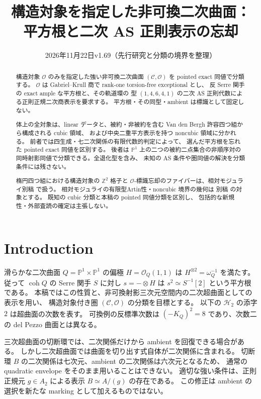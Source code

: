 \documentclass[a4paper,11pt]{ltjsarticle}
\title{構造対象を指定した非可換二次曲面：\\平方根と二次 AS 正則表示の忘却}
\author{}
\date{2026年11月22日\quad v1.69（先行研究と分類の境界を整理）}
\numberwithin{equation}{section}
\theoremstyle{plain}
\theoremstyle{definition}
\theoremstyle{remark}
\newcommand{\OO}{\mathcal O}
\newcommand{\cC}{\mathcal C}
\newcommand{\PP}{\mathbb P}
\newcommand{\HH}{\mathcal H_2}
\DeclareMathOperator{\coh}{coh}
\begin{document}
\maketitle
\begin{abstract}
構造対象 $\OO$ のみを指定した強い非可換二次曲面
$(\cC,\OO)$ を pointed exact 同値で分類する。
$\OO$ は Gabriel--Krull 商で rank-one torsion-free exceptional とし、
反 Serre 関手の exact ample な平方根と、その軌道環の
型 $(1,4,6,4,1)$ の二次 AS 正則代数による正則正規二次商表示を要求する。
平方根・その同型・ambient は標識として固定しない。

体上の全対象は、linear データと、被約・非被約を含む
Van den Bergh 許容四つ組から構成される cubic 領域、
および中央二重平方表示を持つ noncubic 領域に分かれる。
前者では四生成・七二次関係の有限代数的判定によって、
選んだ平方根を忘れた pointed exact 同値を区別する。
後者は $\PP^1$ 上の二つの被約二点集合の非順序対の
同時射影同値で分類できる。全退化型を含み、
未知の AS 条件や圏同値の解決を分類条件には残さない。

楕円四つ組における構造対象の $\mathbb Z^2$ 格子と
$\OO$-標識忘却のファイバーは、相対モジュライ別稿
\cite{QuadricModuli2026} で扱う。
相対モジュライの有限型Artin性・noncubic 境界の幾何は
別稿 \cite{QuadricModuli2026} の対象とする。
既知の cubic 分類と本稿の pointed 同値分類を区別し、
包括的な新規性・外部査読の確定は主張しない。
\end{abstract}
\tableofcontents

\section{Introduction}
\label{sec:introduction}

滑らかな二次曲面 $Q=\PP^1\times\PP^1$ の偏極
$H=\OO_Q(1,1)$ は $H^{\otimes2}=\omega_Q^{-1}$ を満たす。
従って $\coh Q$ の Serre 関手 $S$ に対し
$s=-\otimes H$ は $s^2\simeq S^{-1}[2]$ という平方根である。
本稿ではこの性質と、非可換射影三次元空間内の二次超曲面としての表示を用い、
構造対象付き圏 $(\cC,\OO)$ の分類を目標とする。
以下の $\HH$ の添字 $2$ は超曲面の次数を表す。
可換例の反標準次数は $(-K_Q)^2=8$ であり、次数二の del Pezzo 曲面とは異なる。

三次超曲面の切断環では、二次関係だけから ambient を回復できる場合がある。
しかし二次超曲面では曲面を切り出す式自体が二次関係に含まれる。
切断環 $B$ の二次関係は七次元、ambient の二次関係は六次元となるため、
通常の quadratic envelope をそのまま用いることはできない。
適切な強い条件は、正則正規元 $g\in A_2$ による表示 $B\simeq A/(g)$ の存在である。
この修正は ambient の選択を新たな marking として加えるものではない。
\end{document}
